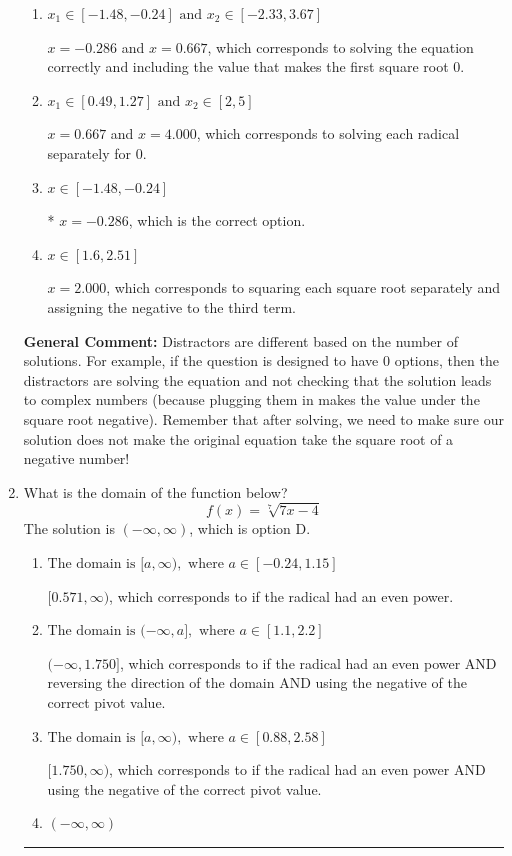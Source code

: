 \documentclass{extbook}[14pt]
\newcommand{\litem}[1]{\item #1

\rule{\textwidth}{0.4pt}}
\begin{document}
\begin{enumerate}
{\begin{enumerate}[label=\Alph*.]
This corresponds to believing the solution $x = -0.286$ leads to a complex value in the original equation.
\item \( x_1 \in [-1.48, -0.24] \text{ and } x_2 \in [-2.33,3.67] \)

$x = -0.286$ and $x = 0.667$, which corresponds to solving the equation correctly and including the value that makes the first square root 0.
\item \( x_1 \in [0.49, 1.27] \text{ and } x_2 \in [2,5] \)

$x = 0.667$ and $x = 4.000$, which corresponds to solving each radical separately for 0.
\item \( x \in [-1.48,-0.24] \)

* $x = -0.286$, which is the correct option.
\item \( x \in [1.6,2.51] \)

$x = 2.000$, which corresponds to squaring each square root separately and assigning the negative to the third term.
\end{enumerate}

\textbf{General Comment:} Distractors are different based on the number of solutions. For example, if the question is designed to have 0 options, then the distractors are solving the equation and not checking that the solution leads to complex numbers (because plugging them in makes the value under the square root negative). Remember that after solving, we need to make sure our solution does not make the original equation take the square root of a negative number!
}
\litem{
What is the domain of the function below?
\[ f(x) = \sqrt[7]{7 x - 4} \]The solution is \( (-\infty, \infty) \), which is option D.\begin{enumerate}[label=\Alph*.]
\item \( \text{The domain is } [a, \infty), \text{   where } a \in [-0.24, 1.15] \)

$[0.571, \infty)$, which corresponds to if the radical had an even power.
\item \( \text{The domain is } (-\infty, a], \text{   where } a \in [1.1, 2.2] \)

$(-\infty, 1.750]$, which corresponds to if the radical had an even power AND reversing the direction of the domain AND using the negative of the correct pivot value.
\item \( \text{The domain is } [a, \infty), \text{   where } a \in [0.88, 2.58] \)

$[1.750, \infty)$, which corresponds to if the radical had an even power AND using the negative of the correct pivot value.
\item \( (-\infty, \infty) \)


\end{enumerate}}
\end{enumerate}
\end{document}
